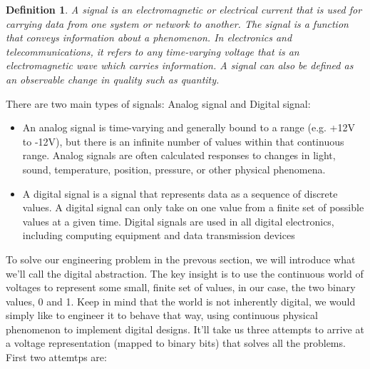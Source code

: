 \documentclass[a4paper,twoside]{article}
\newtheorem{definition}[theorem]{Definition}
\numberwithin{equation}{section}
\begin{document}
\begin{definition}
    A signal is an electromagnetic or electrical current that is used for carrying data from one
    system or network to another. The signal is a function that conveys information about a phenomenon.
    In electronics and telecommunications, it refers to any time-varying voltage that is an
    electromagnetic wave which carries information. A signal can also be defined as an observable
    change in quality such as quantity.
\end{definition}
There are two main types of signals: Analog signal and Digital signal:
\begin{itemize}
    \item An analog signal is time-varying and generally bound to a range (e.g. +12V to -12V),
          but there is an infinite number of values within that continuous range. Analog signals are often
          calculated responses to changes in light, sound, temperature, position, pressure, or other physical
          phenomena.
    \item A digital signal is a signal that represents data as a sequence of discrete values.
          A digital signal can only take on one value from a finite set of possible values at a given time.
          Digital signals are used in all digital electronics, including computing equipment and data
          transmission    devices
\end{itemize}
To solve our engineering problem in the prevous section, we will introduce what we'll call the digital
abstraction. The key insight is to use the continuous world of voltages to represent some small,
finite set of values, in our case, the two binary values, 0 and 1. Keep in mind that the world is not
inherently digital, we would simply like to engineer it to behave that way, using continuous physical
phenomenon to implement digital designs. It'll take us three attempts to arrive at a voltage representation
 (mapped to binary bits) that solves all the problems. First two attemtps are:
\end{document}
